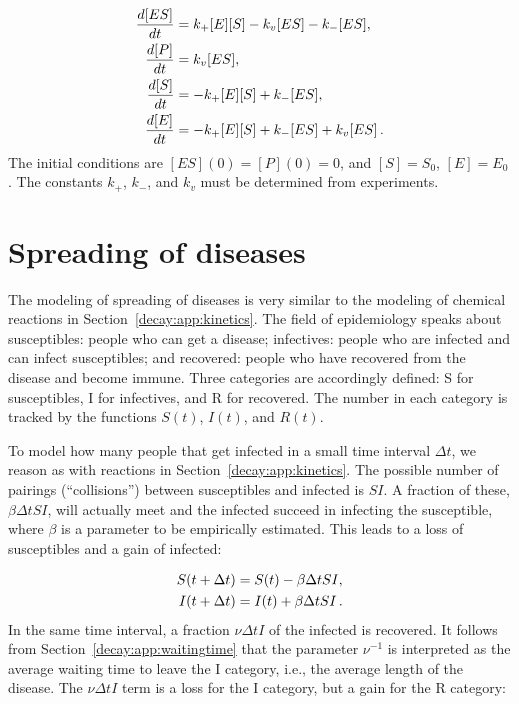 \documentclass[%
oneside,                 %
final,                   %
10pt]{article}
\begin{document}
\begin{align}
\frac{d[ES]}{dt} &= k_+[E][S] - k_v[ES] - k_-[ES],
\label{decay:app:MMK:ES1}\\ 
\frac{d[P]}{dt} &= k_v[ES],
\label{decay:app:MMK:P1}\\ 
\frac{d[S]}{dt} &= -k_+[E][S] + k_-[ES],
\label{decay:app:MMK:S1}\\ 
\frac{d[E]}{dt} &= -k_+[E][S] + k_-[ES] + k_v[ES]\tp
\label{decay:app:MMK:E1}
\end{align}
The initial conditions are $[ES](0)=[P](0)=0$, and $[S]=S_0$, $[E]=E_0$.
The constants $k_+$, $k_-$, and $k_v$ must be determined from experiments.



\section{Spreading of diseases}
\label{decay:app:SIR}

The modeling of spreading of diseases is very similar to the modeling
of chemical reactions in Section~\ref{decay:app:kinetics}. The field
of epidemiology speaks about susceptibles: people who can get a disease;
infectives: people who are infected and can infect susceptibles; and
recovered: people who have recovered from the disease and
become immune.
Three categories are accordingly defined: S for susceptibles, I for
infectives, and R for recovered. The number in each category is tracked
by the functions $S(t)$, $I(t)$, and $R(t)$.

To model how many people that get infected in a small time interval
$\Delta t$, we reason as with reactions in Section~\ref{decay:app:kinetics}.
The possible number of pairings (``collisions'') between susceptibles
and infected is $SI$. A fraction of these, $\beta\Delta t SI$,
will actually meet and the infected succeed in infecting the susceptible,
where $\beta$ is a parameter to be empirically estimated.
This leads to a loss of susceptibles and a gain of infected:

\begin{align*}
S(t+\Delta t) &= S(t) - \beta\Delta tSI,\\ 
I(t+\Delta t) &= I(t) + \beta\Delta tSI\tp
\end{align*}
In the same time interval, a fraction $\nu\Delta t I$
of the infected is recovered.
It follows from Section~\ref{decay:app:waitingtime}
that the parameter $\nu^{-1}$ is interpreted as the average
waiting time to leave the I category, i.e., the
average length of the disease.
The $\nu \Delta tI$ term is a loss for the I category, but a gain for the R
category:
\end{document}

